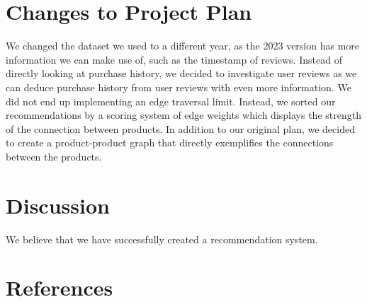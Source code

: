 \documentclass[fontsize=11pt]{article}
\begin{document}
\section*{Changes to Project Plan}
We changed the dataset we used to a different year, as the 2023 version has more information we can make use of, such as the timestamp of reviews. Instead of directly looking at purchase history, we decided to investigate user reviews as we can deduce purchase history from user reviews with even more information. We did not end up implementing an edge traversal limit. Instead, we sorted our recommendations by a scoring system of edge weights which displays the strength of the connection between products. In addition to our original plan, we decided to create a product-product graph that directly exemplifies the connections between the products.

\section*{Discussion}
We believe that we have successfully created a recommendation system.

\section*{References}
\end{document}
